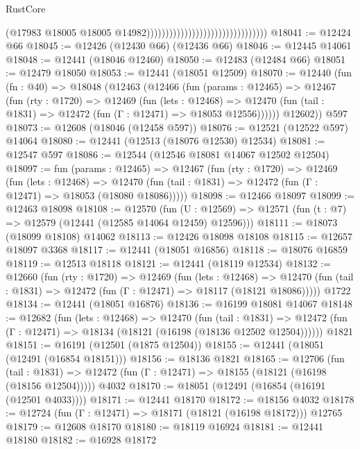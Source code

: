 \begin{lexlean}{RustCore}
\begin{coremodule}
                                                                  (@17983
                                                                    @18005
                                                                    @18005
                                                                    @14982))))))))))))))))))))))))))))))))
@18041 := @12424 @66
@18045 := @12426 (@12430 @66) (@12436 @66)
@18046 := @12445 @14061
@18048 := @12441 (@18046 @12460)
@18050 := @12483 (@12484 @66)
@18051 := @12479 @18050
@18053 := @12441 (@18051 @12509)
@18070 := @12440
    (fun (fn : @40) =>
    @18048
      (@12463
        (@12466
          (fun (params : @12465) =>
          @12467
            (fun (rty : @1720) =>
            @12469
              (fun (lets : @12468) =>
              @12470 (fun (tail : @1831) => @12472 (fun (Γ : @12471) => @18053 @12556))))))
        @12602))
    @597
@18073 := @12608 (@18046 (@12458 @597))
@18076 := @12521 (@12522 @597) @14064
@18080 := @12441 (@12513 (@18076 @12530) @12534)
@18081 := @12547 @597
@18086 := @12544 (@12546 @18081 @14067 @12502 @12504)
@18097 := fun (params : @12465) =>
  @12467
    (fun (rty : @1720) =>
    @12469
      (fun (lets : @12468) =>
      @12470 (fun (tail : @1831) => @12472 (fun (Γ : @12471) => @18053 (@18080 @18086)))))
@18098 := @12466 @18097
@18099 := @12463 @18098
@18108 := @12570
    (fun (U : @12569) => @12571 (fun (t : @7) => @12579 (@12441 (@12585 @14064 @12459) @12596)))
@18111 := @18073 (@18099 @18108) @14062
@18113 := @12426 @18098 @18108
@18115 := @12657 @18097 @3368
@18117 := @12441 (@18051 @16856)
@18118 := @18076 @16859
@18119 := @12513 @18118
@18121 := @12441 (@18119 @12534)
@18132 := @12660
    (fun (rty : @1720) =>
    @12469
      (fun (lets : @12468) =>
      @12470 (fun (tail : @1831) => @12472 (fun (Γ : @12471) => @18117 (@18121 @18086)))))
    @1722
@18134 := @12441 (@18051 @16876)
@18136 := @16199 @18081 @14067
@18148 := @12682
    (fun (lets : @12468) =>
    @12470
      (fun (tail : @1831) =>
      @12472 (fun (Γ : @12471) => @18134 (@18121 (@16198 (@18136 @12502 @12504))))))
    @1821
@18151 := @16191 (@12501 (@1875 @12504))
@18155 := @12441 (@18051 (@12491 (@16854 @18151)))
@18156 := @18136 @1821
@18165 := @12706
    (fun (tail : @1831) => @12472 (fun (Γ : @12471) => @18155 (@18121 (@16198 (@18156 @12504)))))
    @4032
@18170 := @18051 (@12491 (@16854 (@16191 (@12501 @4033))))
@18171 := @12441 @18170
@18172 := @18156 @4032
@18178 := @12724 (fun (Γ : @12471) => @18171 (@18121 (@16198 @18172))) @12765
@18179 := @12608 @18170
@18180 := @18119 @16924
@18181 := @12441 @18180
@18182 := @16928 @18172

\end{coremodule}
\end{lexlean}
